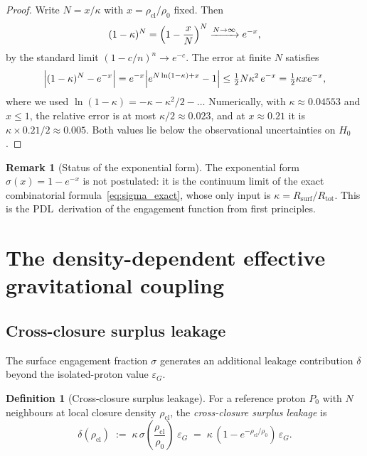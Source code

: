 \documentclass[11pt,a4paper]{article}
\theoremstyle{definition}
\newtheorem{definition}[theorem]{Definition}
\newtheorem{remark}[theorem]{Remark}
\newcommand{\PDL}{\textnormal{PDL}}
\newcommand{\Rsurf}{R_{\mathrm{surf}}}
\newcommand{\Rtot}{R_{\mathrm{tot}}}
\newcommand{\epsg}{\varepsilon_G}
\newcommand{\kap}{\kappa}
\newcommand{\sig}{\sigma}
\newcommand{\rhocl}{\rho_{\mathrm{cl}}}
\newcommand{\rhoO}{\rho_0}
\newcommand{\Hzero}{H_0}
\begin{document}
\begin{proof}
Write $N = x/\kap$ with $x = \rhocl/\rhoO$ fixed. Then
\[
  (1-\kap)^N = \Bigl(1 - \frac{x}{N}\Bigr)^N \xrightarrow{N\to\infty} e^{-x},
\]
by the standard limit $(1-c/n)^n \to e^{-c}$. The error at finite $N$ satisfies
\[
  \Bigl|(1-\kap)^N - e^{-x}\Bigr| = e^{-x}\Bigl|e^{N\ln(1-\kap)+x} - 1\Bigr| \leq \tfrac{1}{2}N\kap^2\,e^{-x} = \tfrac{1}{2}\kap x e^{-x},
\]
where we used $\ln(1-\kap) = -\kap - \kap^2/2 - \ldots$ Numerically, with $\kap \approx 0.04553$ and $x \leq 1$, the relative error is at most $\kap/2 \approx 0.023$, and at $x \approx 0.21$ it is $\kap \times 0.21/2 \approx 0.005$. Both values lie below the observational uncertainties on $\Hzero$.
\end{proof}

\begin{remark}[Status of the exponential form]
\label{rem:exponential}
The exponential form $\sig(x) = 1-e^{-x}$ is not postulated: it is the continuum limit of the exact combinatorial formula~\eqref{eq:sigma_exact}, whose only input is $\kap = \Rsurf/\Rtot$. This is the \PDL\ derivation of the engagement function from first principles.
\end{remark}

\section{The density-dependent effective gravitational coupling}
\label{sec:Geff}

\subsection{Cross-closure surplus leakage}
\label{subsec:delta}

The surface engagement fraction $\sig$ generates an additional leakage contribution $\delta$ beyond the isolated-proton value $\epsg$.

\begin{definition}[Cross-closure surplus leakage]
\label{def:delta}
For a reference proton $P_0$ with $N$ neighbours at local closure density $\rhocl$, the \emph{cross-closure surplus leakage} is
\begin{equation}
  \label{eq:delta_def}
  \delta(\rhocl) \;:=\; \kap\,\sig\!\left(\frac{\rhocl}{\rhoO}\right) \;\epsg \;=\; \kap\,(1-e^{-\rhocl/\rhoO})\,\epsg.
\end{equation}
\end{definition}
\end{document}
